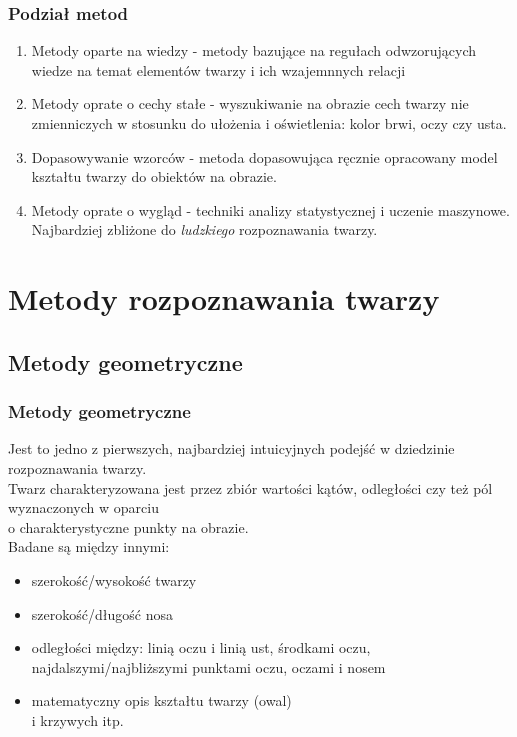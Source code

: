 \documentclass[xcolor=table]{beamer}
\begin{document}
\begin{frame}
\frametitle{Podział metod}

\begin{enumerate}
\item Metody oparte na wiedzy - metody bazujące na regułach odwzorujących wiedze na temat elementów twarzy i ich wzajemnnych relacji \pause
\item Metody oprate o cechy stałe - wyszukiwanie na obrazie cech twarzy nie zmienniczych w stosunku do ułożenia i oświetlenia: kolor brwi, oczy czy usta. \pause
\item Dopasowywanie wzorców - metoda dopasowująca ręcznie opracowany model kształtu twarzy do obiektów na obrazie. \pause
\item Metody oprate o wygląd - techniki analizy statystycznej i uczenie maszynowe. Najbardziej zbliżone do \emph{ludzkiego} rozpoznawania twarzy.
\end{enumerate}
   
\end{frame}


\section{Metody rozpoznawania twarzy}

\subsection{Metody geometryczne}
\begin{frame}
  \frametitle{Metody geometryczne}

Jest to jedno z pierwszych, najbardziej intuicyjnych podejść w dziedzinie rozpoznawania twarzy. \\
Twarz charakteryzowana jest przez zbiór wartości kątów, odległości czy też pól wyznaczonych w oparciu \\
o charakterystyczne punkty na obrazie. \\
Badane są między innymi:
\begin{itemize}
\item szerokość/wysokość twarzy
\item szerokość/długość nosa
\item odległości między: linią oczu i linią ust, środkami oczu, najdalszymi/najbliższymi punktami oczu, oczami i nosem
\item matematyczny opis kształtu twarzy (owal) \\i krzywych itp.
\end{itemize}
\end{frame}
\end{document}
